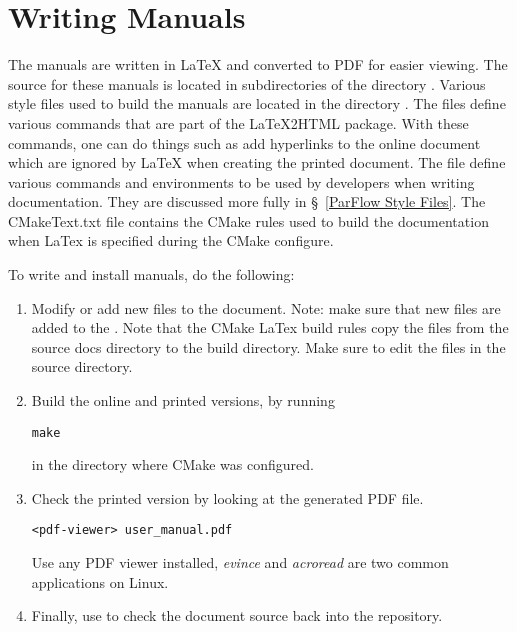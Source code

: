 \section{Writing Manuals}
\label{Writing Manuals}

The \parflow{} manuals are written in LaTeX and converted to PDF for
easier viewing.  The source for these manuals is located in
subdirectories of the directory .  Various
style files used to build the \parflow{} manuals are located in the
directory .  The files 
define various commands that are part of the LaTeX2HTML package.  With
these commands, one can do things such as add hyperlinks to the online
document which are ignored by LaTeX when creating the printed
document.  The file  define various commands and
environments to be used by \parflow{} developers when writing
documentation.  They are discussed more fully in \S~\ref{ParFlow Style
  Files}.  The CMakeText.txt file contains the CMake rules used to
build the documentation when LaTex is specified during the CMake
configure.

To write and install \parflow{} manuals, do the following:
\begin{enumerate}

\item
Modify or add new  files to the document.
Note: make sure that new files are added to the
.
Note that the CMake LaTex build rules copy the files from the source docs directory to 
the build directory.   Make sure to edit the files in the source directory.

\item
Build the online and printed versions, by running
\begin{display}\begin{verbatim}
make
\end{verbatim}\end{display}
in the directory where CMake was configured.

\item
Check the printed version by looking at the generated PDF file.
\begin{display}\begin{verbatim}
<pdf-viewer> user_manual.pdf
\end{verbatim}\end{display}
Use any PDF viewer installed, {\em evince} and {\em acroread} are two common applications on Linux.

\item
Finally, use  to check the document source back
into the repository.

\end{enumerate}

